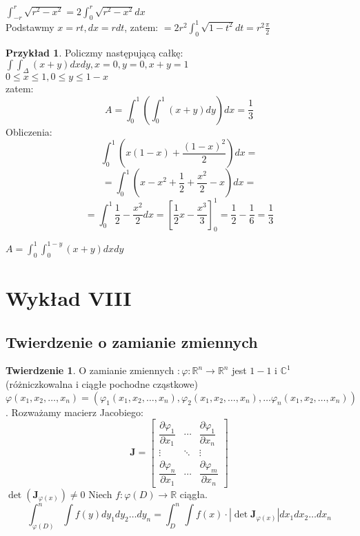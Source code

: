 \documentclass{article}
\theoremstyle{definition}
\theoremstyle{definition}
\newtheorem{tw}{Twierdzenie}[subsection]
\theoremstyle{definition}
\newtheorem{pk}{Przykład}[subsection]
\theoremstyle{definition}
\theoremstyle{definition}
\theoremstyle{definition}
\theoremstyle{definition}
\begin{document}
$\int_{-r}^{r} \sqrt{r^2-x^2} = 2\int_{0}^{r} \sqrt{r^2-x^2} dx$\\
Podstawmy $x=rt, dx = r dt$, zatem:
$=2r^2 \int_0^1 \sqrt{1-t^2} dt = r^2 \frac{\pi}{2}$

\begin{pk}
Policzmy następującą całkę:\\
$\int \int_{\Delta} (x+y) dx dy, x=0,y=0, x+y=1$\\
$0 \leq x \leq 1, 0 \leq y \leq 1-x$\\
zatem:
\[A=\int_0^1 \left( \int_0^1 (x+y) dy\right) dx = \frac{1}{3}\]
Obliczenia:
\[\int_0^1 \left(x(1-x) + \frac{(1-x)^2}{2}\right) dx=\]
\[=\int_0^1 (x-x^2+\frac{1}{2} + \frac{x^2}{2} - x) dx=\]
\[=\int_0^1 \frac{1}{2} - \frac{x^2}{2} dx = \left[\frac{1}{2} x - \frac{x^3}{3}\right]_0^1 = \frac{1}{2} - \frac{1}{6} = \frac{1}{3}\]
\end{pk}

$A=\int_0^1 \int_0^{1-y} (x+y) dx dy$

\section{Wykład VIII}

\subsection{Twierdzenie o zamianie zmiennych}

\begin{tw}
    O zamianie zmiennych $:\varphi: \mathbb{R}^n \rightarrow \mathbb{R}^n$ jest $1-1$ i $\mathbb{C}^{1}$ (różniczkowalna i ciągłe pochodne cząstkowe)
    $\varphi(x_1,x_2,\dots,x_n)=\left(\varphi_1(x_1,x_2,\dots,x_n), \varphi_2(x_1,x_2,\dots,x_n), \dots \varphi_n(x_1,x_2,\dots,x_n)\right)$.
    Rozważamy macierz Jacobiego:
    \[\mathbf {J} ={\begin{bmatrix}{\dfrac {\partial \varphi_{1}}{\partial x_{1}}}&\cdots &{\dfrac {\partial \varphi_{1}}{\partial x_{n}}}\\\vdots &\ddots &\vdots \\{\dfrac {\partial \varphi_{n}}{\partial x_{1}}}&\cdots &{\dfrac {\partial \varphi_{m}}{\partial x_{n}}}\end{bmatrix}}\]
    $\det\left(\mathbf {J}_{\varphi(x)}\right) \neq 0$
    Niech $f:\varphi(D)\rightarrow\mathbb{R}$ ciągła.
    \[\int_{\varphi(D)}^{n}\int f(y) dy_1 dy_2 \dots dy_n = \int_{D}^{n} \int f(x) \cdot \left|\det\mathbf{J}_{\varphi(x)}\right| dx_1 dx_2 \dots dx_n\]
\end{tw}
\end{document}
